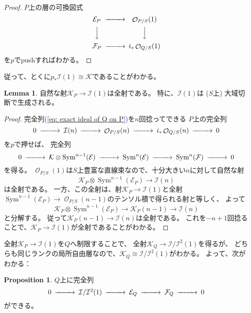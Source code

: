 \documentclass[uplatex]{jsarticle}
\renewcommand{\eqref}[1]{\textcolor{blue}{(\ref{#1})}}
\theoremstyle{definition}
\newtheorem{prop}[prop]{Proposition}
\newtheorem{lem}[lem]{Lemma}
\DeclareMathOperator{\Sym}{\mathrm{Sym}}
\newcommand{\mcE}{\mathcal{E}}
\newcommand{\mcF}{\mathcal{F}}
\newcommand{\mcI}{\mathcal{I}}
\newcommand{\mcK}{\mathcal{K}}
\newcommand{\mcO}{\mathcal{O}}
\DeclareMathOperator{\OOO}{\mcO}
\newcommand{\OO}[1]{\OOO_{#1}}
\begin{document}
\begin{proof}
  \(P\)上の層の可換図式
  \[
  \begin{CD}
    \mcE_P @>>> \OO{P/S}(1) \\
    @VVV @VVV \\
    \mcF_P @>>> i_*\OO{Q/S}(1)
  \end{CD}
  \]
  を\(p\)でpushすればわかる。
\end{proof}

従って、とくに\(p_*\mcI(1)\cong \mcK\)であることがわかる。

\begin{lem}
  自然な射\(\mcK_P \to \mcI(1)\)は全射である。
  特に、\(\mcI(1)\)は (\(S\)上) 大域切断で生成される。
\end{lem}

\begin{proof}
  完全列\eqref{eq: exact ideal of Q on P}を\(n\)回捻ってできる
  \(P\)上の完全列
  \[
  \begin{CD}
    0 @>>> \mcI(n) @>>> \OO{P/S}(n) @>>> i_*\OO{Q/S}(n) @>>> 0
  \end{CD}
  \]
  を\(p\)で押せば、
  完全列
  \[
  \begin{CD}
    0 @>>> \mcK \otimes \Sym^{n-1}(\mcE) @>>> \Sym^n(\mcE) @>>> \Sym^n(\mcF) @>>> 0
  \end{CD}
  \]
  を得る。
  \(\OO{P/S}(1)\)は\(S\)上豊富な直線束なので、十分大きい\(n\)に対して自然な射
  \[\mcK_P \otimes \Sym^{n-1}(\mcE_P) \to \mcI(n)\]
  は全射である。
  一方、この全射は、射\(\mcK_P \to \mcI(1)\)と全射
  \(\Sym^{n-1}(\mcE_P)\to \OO{P/S}(n-1)\)のテンソル積で得られる射と等しく、
  よって
  \[
  \mcK_P \otimes \Sym^{n-1}(\mcE_P) \to \mcK_P (n-1) \to \mcI(n)
  \]
  と分解する。
  従って\(\mcK_P (n-1) \to \mcI(n)\)は全射である。
  これを\(-n+1\)回捻ることで、\(\mcK_P\to \mcI(1)\)が全射であることがわかる。
\end{proof}

全射\(\mcK_P\to \mcI(1)\)を\(Q\)へ制限することで、
全射\(\mcK_Q \to \mcI/\mcI^2(1)\)を得るが、
どちらも同じランクの局所自由層なので、\(\mcK_Q\cong \mcI/\mcI^2(1)\)がわかる。
よって、次がわかる：

\begin{prop}
  \(Q\)上に完全列
  \[
  \begin{CD}
    0 @>>> \mcI/\mcI^2(1) @>>> \mcE_Q @>>> \mcF_Q @>>> 0
  \end{CD}
  \]
  ができる。
\end{prop}
\end{document}
